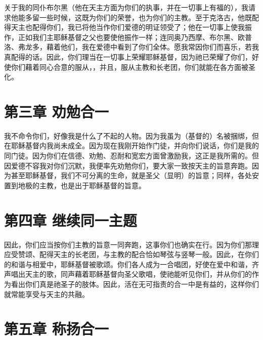 关于我的同仆布尔黑（他在天主方面为你们的执事，并在一切事上有福的），我请求他能多留一些时候，这既为你们的荣誉，也为你们的主教。至于克洛古，他既配得天主也配得你们，我已将他当作你们爱德的明证领受了；他在一切事上使我振作，正如我们主耶稣基督之父也要使他振作一样；连同奥乃西摩、布尔黑、欧普洛、弗龙多，藉着他们，我在爱德中看到了你们全体。愿我常因你们而喜乐，若我真配得的话。因此，你们理当在一切事上荣耀耶稣基督，因为祂已荣耀了你们，好使你们藉着同心合意的服从，，并且，服从主教和长老团，你们就能在各方面被圣化。\par


\section{第三章 劝勉合一}

我不命令你们，好像我是什么了不起的人物。因为我虽为（基督的）名被捆绑，但在耶稣基督内我尚未成全。因为现在我刚开始作门徒，并向你们说话，你们是我的同门徒。因为你们在信德、劝勉、忍耐和宽宏方面曾激励我，这正是我所需的。但因爱德不容我对你们沉默，我便率先劝勉你们，要大家一致按天主的旨意奔跑。因为甚至耶稣基督，我们不可分离的生命，就是圣父（显明）的旨意；同样，各处安置到地极的主教，也是出于耶稣基督的旨意。\par


\section{第四章 继续同一主题}

因此，你们应当按你们主教的旨意一同奔跑，这事你们也确实在行。因为你们那理应受赞颂、配得天主的长老团，与主教的配合恰如琴弦与竖琴一般。因此，在你们的和谐与相爱中，耶稣基督被歌颂。你们各人成为一合唱团，好使在爱中和谐，齐声唱出天主的歌，同声藉着耶稣基督向圣父歌唱，使祂能听见你们，并从你们的作为看出你们真是祂圣子的肢体。因此，活在无可指责的合一中是有益的，这样你们就常能享受与天主的共融。\par


\section{第五章 称扬合一}


